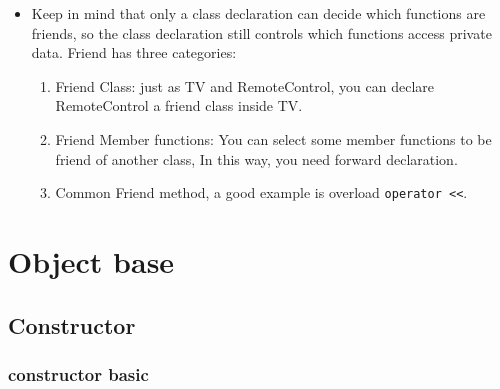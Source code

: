 \documentclass[a4paper,11pt,twoside]{book}
\begin{document}
\begin{itemize}
	\item Keep in mind that only a class declaration can decide which functions are friends, so the class declaration still controls which functions access private data. Friend has three categories:

\begin{enumerate}
	\item Friend Class: just as TV and RemoteControl, you can declare RemoteControl a friend class inside TV.
	
	\item Friend Member functions: You can select some member functions to be friend of another class, In this way, you need forward declaration.  
	
	\item Common Friend method, a good example is overload \verb=operator <<=. 
\end{enumerate}
	
\end{itemize}

\section{Object base}
\subsection{Constructor}

\subsubsection{constructor basic}
\end{document}
